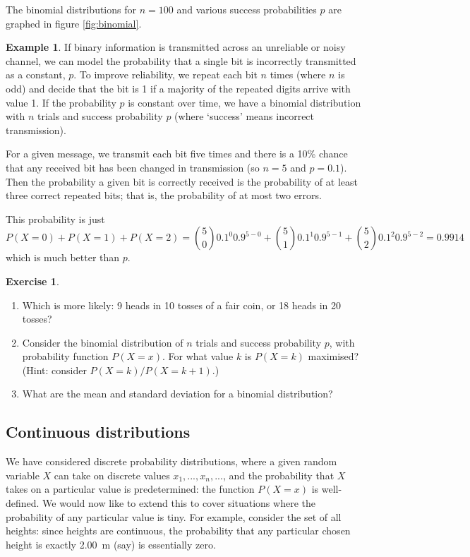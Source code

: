 \documentclass[a4paper,leqno]{article}
\numberwithin{equation}{section}
\theoremstyle{definition}
\newtheorem{ex}[equation]{Example}
\newtheorem{exercise}[equation]{Exercise}
\theoremstyle{remark}
\begin{document}
The binomial distributions for $ n = 100 $ and various success probabilities $ p $ are graphed in figure \ref{fig:binomial}.

\begin{ex}
  If binary information is transmitted across an unreliable or noisy channel, we can model the probability
  that a single bit is incorrectly transmitted as a constant, $ p $. To improve reliability, we repeat each
  bit $ n $ times (where $ n $ is odd) and decide that the bit is 1 if a majority of the repeated digits arrive
  with value 1. If the probability $ p $ is constant over time, we have a binomial distribution with $ n $ trials
  and success probability $ p $ (where `success' means incorrect transmission).

  For a given message, we transmit each bit five times and there is a 10\% chance that any received bit has been
  changed in transmission (so $ n = 5 $ and $ p = 0.1 $). Then the probability a given bit is correctly received
  is the probability of at least three correct repeated bits; that is, the probability of at most two errors.

  This probability is just
  \begin{displaymath}
    P(X = 0) + P(X = 1) + P(X = 2) = \binom{5}{0} 0.1^0 0.9^{5-0} + \binom{5}{1} 0.1^1 0.9^{5-1} + \binom{5}{2} 0.1^2 0.9^{5-2} = 0.9914
  \end{displaymath}
  which is much better than $ p $.
\end{ex}

\begin{exercise}\leavevmode
  \begin{enumerate}
    \item Which is more likely: 9 heads in 10 tosses of a fair coin, or 18 heads in 20 tosses?
    \item Consider the binomial distribution of $ n $ trials and success probability $ p $, with probability function $ P(X = x) $. For what
          value $ k $ is $ P(X = k) $ maximised? (Hint: consider $ P(X = k)/P(X = k+1) $.)
    \item What are the mean and standard deviation for a binomial distribution?
  \end{enumerate}
\end{exercise}

\subsection{Continuous distributions}
We have considered discrete probability distributions, where a given random variable $ X $ can take on discrete
values $ x_1,...,x_n,... $, and the probability that $ X $ takes on a particular value is predetermined: the
function $ P(X = x) $ is well-defined. We would now like to extend this to cover situations where the probability
of any particular value is tiny. For example, consider the set of all heights: since heights are continuous, the
probability that any particular chosen height is exactly \SI{2.00}{\metre} (say) is essentially zero.
\end{document}
